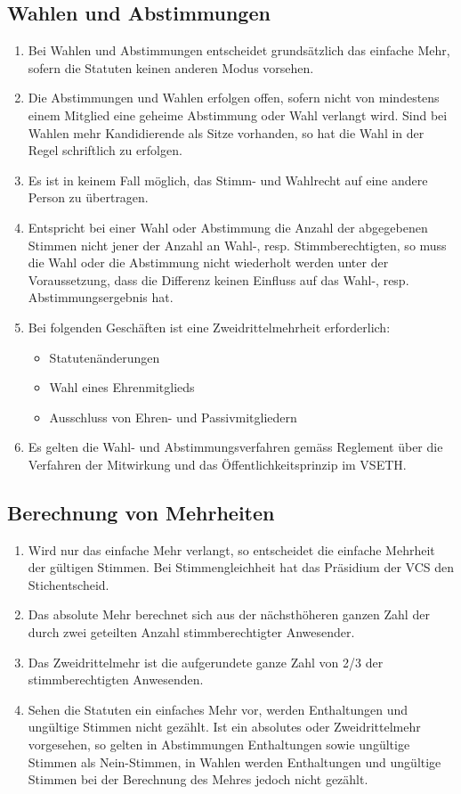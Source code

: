 \subsection{Wahlen und Abstimmungen}
\begin{enumerate}
\item Bei Wahlen und Abstimmungen entscheidet grundsätzlich das einfache Mehr, sofern die Statuten keinen anderen Modus vorsehen.
\item Die Abstimmungen und Wahlen erfolgen offen, sofern nicht von mindestens einem Mitglied eine geheime Abstimmung oder Wahl verlangt wird. Sind bei Wahlen mehr Kandidierende als Sitze vorhanden, so hat die Wahl in der Regel schriftlich zu erfolgen.
\item Es ist in keinem Fall möglich, das Stimm- und Wahlrecht auf eine andere Person zu übertragen.
\item Entspricht bei einer Wahl oder Abstimmung die Anzahl der abgegebenen Stimmen nicht jener der Anzahl an Wahl-, resp. Stimmberechtigten, so muss die Wahl oder die Abstimmung nicht wiederholt werden unter der Voraussetzung, dass die Differenz keinen Einfluss auf das Wahl-, resp. Abstimmungsergebnis hat.
\item Bei folgenden Geschäften ist eine Zweidrittelmehrheit erforderlich:
	\begin{itemize}
	\item Statutenänderungen
  \item Wahl eines Ehrenmitglieds
	\item Ausschluss von Ehren- und Passivmitgliedern
	\end{itemize}
\item Es gelten die Wahl- und Abstimmungsverfahren gemäss Reglement über die Verfahren der Mitwirkung und das Öffentlichkeitsprinzip im VSETH.
\end{enumerate}


\subsection{Berechnung von Mehrheiten}
\begin{enumerate}
\item Wird nur das einfache Mehr verlangt, so entscheidet die einfache Mehrheit der gültigen Stimmen. Bei Stimmengleichheit hat das Präsidium der VCS den Stichentscheid.
\item Das absolute Mehr berechnet sich aus der nächsthöheren ganzen Zahl der durch zwei geteilten Anzahl stimmberechtigter Anwesender.
\item Das Zweidrittelmehr ist die aufgerundete ganze Zahl von 2/3 der stimmberechtigten Anwesenden.
\item Sehen die Statuten ein einfaches Mehr vor, werden Enthaltungen und ungültige Stimmen nicht gezählt. Ist ein absolutes oder Zweidrittelmehr vorgesehen, so gelten in Abstimmungen Enthaltungen sowie ungültige Stimmen als Nein-Stimmen, in Wahlen werden Enthaltungen und ungültige Stimmen bei der Berechnung des Mehres jedoch nicht gezählt.
\end{enumerate}

